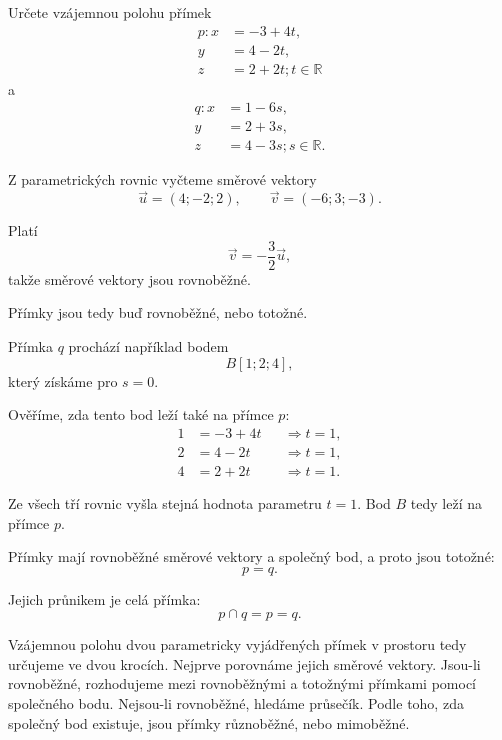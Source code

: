 \begin{example}
    \label{exa:Coincident_parametric_lines_space}
    Určete vzájemnou polohu přímek
    \[
        \begin{aligned}
            p: x&=-3+4t,\\
            y&=4-2t,\\
            z&=2+2t; t\in\mathbb{R}
        \end{aligned}
    \]
    a
    \[
        \begin{aligned}
            q: x&=1-6s,\\
            y&=2+3s,\\
            z&=4-3s; s\in\mathbb{R}.
        \end{aligned}
    \]

    Z parametrických rovnic vyčteme směrové vektory
    \[
        \vec{u}=(4;-2;2),
        \qquad
        \vec{v}=(-6;3;-3).
    \]

    Platí
    \[
        \vec{v}
        =
        -\frac32\vec{u},
    \]
    takže směrové vektory jsou rovnoběžné.

    Přímky jsou tedy buď rovnoběžné, nebo totožné.

    Přímka $q$ prochází například bodem
    \[
        B[1;2;4],
    \]
    který získáme pro $s=0$.

    Ověříme, zda tento bod leží také na přímce $p$:
    \begin{align*}
        1&=-3+4t
        &&\Rightarrow t=1,\\
        2&=4-2t
        &&\Rightarrow t=1,\\
        4&=2+2t
        &&\Rightarrow t=1.
    \end{align*}

    Ze všech tří rovnic vyšla stejná hodnota parametru $t=1$.
    Bod $B$ tedy leží na přímce $p$.

    Přímky mají rovnoběžné směrové vektory a společný bod,
    a proto jsou totožné:
    \[
        p=q.
    \]

    Jejich průnikem je celá přímka:
    \[
        p\cap q=p=q.
    \]
\end{example}

Vzájemnou polohu dvou parametricky vyjádřených přímek v prostoru
tedy určujeme ve dvou krocích. Nejprve porovnáme jejich směrové
vektory. Jsou-li rovnoběžné, rozhodujeme mezi rovnoběžnými a
totožnými přímkami pomocí společného bodu. Nejsou-li rovnoběžné,
hledáme průsečík. Podle toho, zda společný bod existuje, jsou
přímky různoběžné, nebo mimoběžné.

